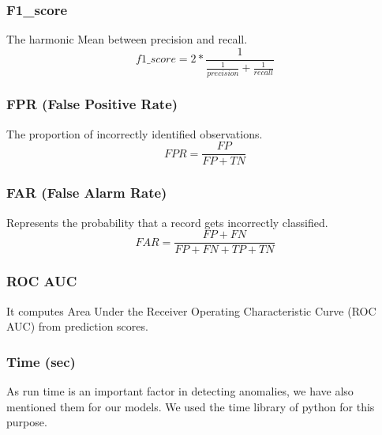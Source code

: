 \documentclass[14pt, conference]{IEEEtran}
\begin{document}
\subsubsection{F1\_score}
The harmonic Mean between precision and recall.
\begin{equation}
    f1\_score = 2 * \frac{1}{\frac{1}{precision}+ \frac{1}{recall}}
\end{equation}

\subsubsection{FPR (False Positive Rate)}
The proportion of incorrectly identified observations.
\begin{equation}
    FPR = \frac{FP}{FP+TN}
\end{equation}

\subsubsection{FAR (False Alarm Rate)}
Represents the probability that a record gets incorrectly classified.
\begin{equation}
    FAR = \frac{FP+FN}{FP+FN+TP+TN}
\end{equation}

\subsubsection{ROC AUC}
It computes Area Under the Receiver Operating Characteristic Curve (ROC AUC) from prediction scores.

\subsubsection{Time (sec)}
As run time is an important factor in detecting anomalies, we have also mentioned them for our models. We used the time
library of python for this purpose.
\end{document}
